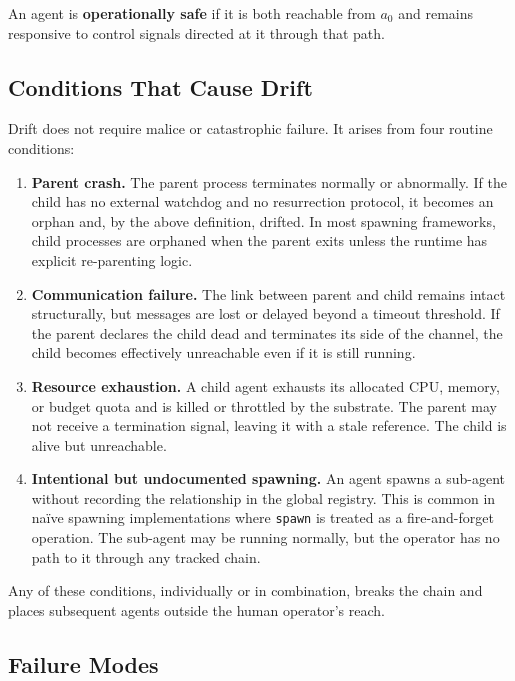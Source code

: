 An agent is \textbf{operationally safe} if it is both reachable from $a_0$ and remains responsive to control signals directed at it through that path.

\subsection{Conditions That Cause Drift}

Drift does not require malice or catastrophic failure. It arises from four routine conditions:

\begin{enumerate}
\item \textbf{Parent crash.} The parent process terminates normally or abnormally. If the child has no external watchdog and no resurrection protocol, it becomes an orphan and, by the above definition, drifted. In most spawning frameworks, child processes are orphaned when the parent exits unless the runtime has explicit re-parenting logic.

\item \textbf{Communication failure.} The link between parent and child remains intact structurally, but messages are lost or delayed beyond a timeout threshold. If the parent declares the child dead and terminates its side of the channel, the child becomes effectively unreachable even if it is still running.

\item \textbf{Resource exhaustion.} A child agent exhausts its allocated CPU, memory, or budget quota and is killed or throttled by the substrate. The parent may not receive a termination signal, leaving it with a stale reference. The child is alive but unreachable.

\item \textbf{Intentional but undocumented spawning.} An agent spawns a sub-agent without recording the relationship in the global registry. This is common in na\"ive spawning implementations where \texttt{spawn} is treated as a fire-and-forget operation. The sub-agent may be running normally, but the operator has no path to it through any tracked chain.
\end{enumerate}

Any of these conditions, individually or in combination, breaks the chain and places subsequent agents outside the human operator's reach.

\subsection{Failure Modes}

